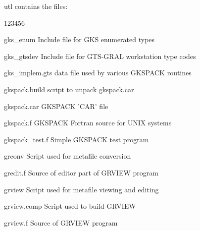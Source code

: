 utl contains the files:
\begin{DLtt}{123456}
\item[gks\_enum]Include file for GKS enumerated types
\item[gks\_gtsdev]Include file for GTS-GRAL workstation type codes
\item[gks\_implem.gts]data file used by various GKSPACK routines
\item[gkspack.build]script to unpack gkspack.car
\item[gkspack.car]GKSPACK 'CAR' file
\item[gkspack.f]GKSPACK Fortran source for UNIX systems
\item[gkspack\_test.f]Simple GKSPACK test program
\item[grconv]Script used for metafile conversion
\item[gredit.f]Source of editor part of GRVIEW program
\item[grview]Script used for metafile viewing and editing
\item[grview.comp]Script used to build GRVIEW
\item[grview.f]Source of GRVIEW program
\end{DLtt}
